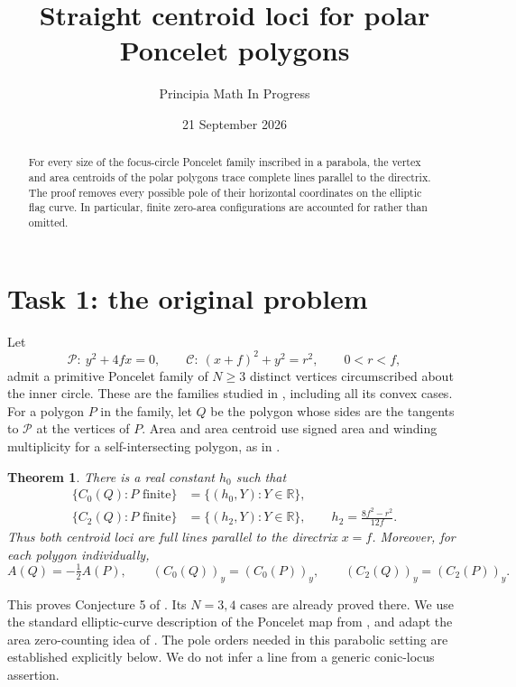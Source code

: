 \documentclass[11pt]{article}
\title{Straight centroid loci for polar Poncelet polygons}
\author{Principia Math In Progress}
\date{21 September 2026}
\newtheorem{theorem}{Theorem}
\newcommand{\R}{\mathbb R}
\begin{document}
\maketitle
\begin{abstract}
For every size of the focus-circle Poncelet family inscribed in a
parabola, the vertex and area centroids of the polar polygons trace
complete lines parallel to the directrix. The proof removes every
possible pole of their horizontal coordinates on the elliptic flag
curve. In particular, finite zero-area configurations are accounted
for rather than omitted.
\end{abstract}

\section*{Task 1: the original problem}
Let
\[
 \mathcal P:\ y^2+4fx=0,\qquad
 \mathcal C:\ (x+f)^2+y^2=r^2,\qquad 0<r<f,
\]
admit a primitive Poncelet family of $N\geq3$ distinct vertices
circumscribed about the inner circle. These are the families studied
in \cite{BGR}, including all its convex cases. For a polygon $P$ in
the family, let $Q$ be the polygon whose sides are the tangents to
$\mathcal P$ at the vertices of $P$. Area and area centroid use
signed area and winding multiplicity for a self-intersecting polygon,
as in \cite{ST,CC}.

\begin{theorem}
There is a real constant $h_0$ such that
\begin{align*}
 \{C_0(Q):P\text{ finite}\}&=\{(h_0,Y):Y\in\R\},\\
 \{C_2(Q):P\text{ finite}\}&=\{(h_2,Y):Y\in\R\},
 \qquad h_2=\frac{8f^2-r^2}{12f}.
\end{align*}
Thus both centroid loci are full lines parallel to the directrix
$x=f$. Moreover, for each polygon individually,
\[
 A(Q)=-\tfrac12 A(P),\qquad
 (C_0(Q))_y=(C_0(P))_y,\qquad
 (C_2(Q))_y=(C_2(P))_y.
\]
\end{theorem}

This proves Conjecture 5 of \cite{BGR}. Its $N=3,4$ cases are already
proved there. We use the standard elliptic-curve description of the
Poncelet map from \cite{ST}, and adapt the area zero-counting idea of
\cite{CC}. The pole orders needed in this parabolic setting are
established explicitly below. We do not infer a line from a generic
conic-locus assertion.
\end{document}
